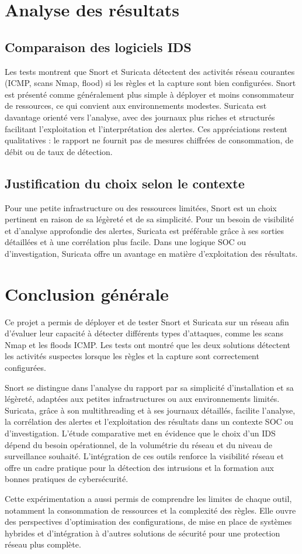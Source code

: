 \section{Analyse des résultats}
\subsection{Comparaison des logiciels IDS}
Les tests montrent que Snort et Suricata détectent des activités réseau courantes (ICMP, scans Nmap, flood) si les règles et la capture sont bien configurées. Snort est présenté comme généralement plus simple à déployer et moins consommateur de ressources, ce qui convient aux environnements modestes. Suricata est davantage orienté vers l'analyse, avec des journaux plus riches et structurés facilitant l'exploitation et l'interprétation des alertes. Ces appréciations restent qualitatives : le rapport ne fournit pas de mesures chiffrées de consommation, de débit ou de taux de détection.

\subsection{Justification du choix selon le contexte}
Pour une petite infrastructure ou des ressources limitées, Snort est un choix pertinent en raison de sa légèreté et de sa simplicité. Pour un besoin de visibilité et d'analyse approfondie des alertes, Suricata est préférable grâce à ses sorties détaillées et à une corrélation plus facile. Dans une logique SOC ou d'investigation, Suricata offre un avantage en matière d'exploitation des résultats.

\section{Conclusion générale}
Ce projet a permis de déployer et de tester Snort et Suricata sur un réseau afin d'évaluer leur capacité à détecter différents types d'attaques, comme les scans Nmap et les floods ICMP. Les tests ont montré que les deux solutions détectent les activités suspectes lorsque les règles et la capture sont correctement configurées.

Snort se distingue dans l'analyse du rapport par sa simplicité d'installation et sa légèreté, adaptées aux petites infrastructures ou aux environnements limités. Suricata, grâce à son multithreading et à ses journaux détaillés, facilite l'analyse, la corrélation des alertes et l'exploitation des résultats dans un contexte SOC ou d'investigation. L'étude comparative met en évidence que le choix d'un IDS dépend du besoin opérationnel, de la volumétrie du réseau et du niveau de surveillance souhaité. L'intégration de ces outils renforce la visibilité réseau et offre un cadre pratique pour la détection des intrusions et la formation aux bonnes pratiques de cybersécurité.

Cette expérimentation a aussi permis de comprendre les limites de chaque outil, notamment la consommation de ressources et la complexité des règles. Elle ouvre des perspectives d'optimisation des configurations, de mise en place de systèmes hybrides et d'intégration à d'autres solutions de sécurité pour une protection réseau plus complète.
